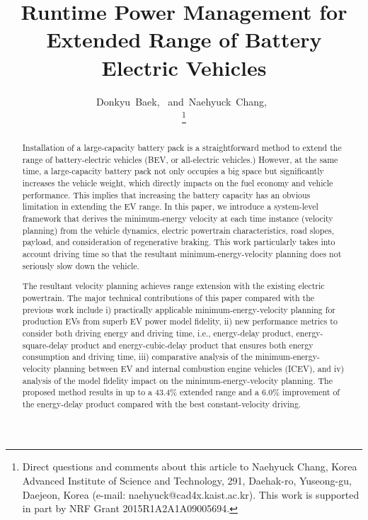 \documentclass{IEEEtran}
\begin{document}
\title{Runtime Power Management for Extended Range of Battery Electric Vehicles}

\author{
Donkyu~Baek,~ 
and~Naehyuck~Chang,~

\thanks{Direct questions and comments about this article to Naehyuck Chang, Korea Advanced Institute of Science and Technology, 291, Daehak-ro, Yuseong-gu, Daejeon, Korea (e-mail: naehyuck@cad4x.kaist.ac.kr). This work is supported in part by NRF Grant 2015R1A2A1A09005694.}
}

\maketitle

\begin{abstract}
Installation of a large-capacity battery pack is a straightforward method to extend the range of battery-electric vehicles (BEV, or all-electric vehicles.) However, at the same time, a large-capacity battery pack not only occupies a big space but significantly increases the vehicle weight, which directly impacts on the  fuel economy and vehicle performance. This implies that increasing the battery capacity has an obvious limitation in extending the EV range. In this paper, we introduce a system-level framework that derives the minimum-energy velocity at each time instance (velocity planning) from the vehicle dynamics, electric powertrain characteristics, road slopes, payload, and consideration of regenerative braking. This work particularly takes into account driving time so that the resultant minimum-energy-velocity planning does not seriously slow down the vehicle. 

The resultant velocity planning achieves range extension with the existing electric powertrain. The major technical contributions of this paper compared with the previous work include i) practically applicable minimum-energy-velocity planning for production EVs from superb EV power model fidelity, ii) new performance metrics to consider both driving energy and driving time, i.e., energy-delay product, energy-square-delay product and energy-cubic-delay product that ensures both energy consumption and driving time, iii) comparative analysis of the minimum-energy-velocity planning between EV and internal combustion engine vehicles (ICEV), and iv) analysis of the model fidelity impact on the minimum-energy-velocity planning. The proposed method results in up to a 43.4\% extended range and a 6.0\% improvement of the energy-delay product compared with the best constant-velocity driving.
\end{abstract}
\end{document}
